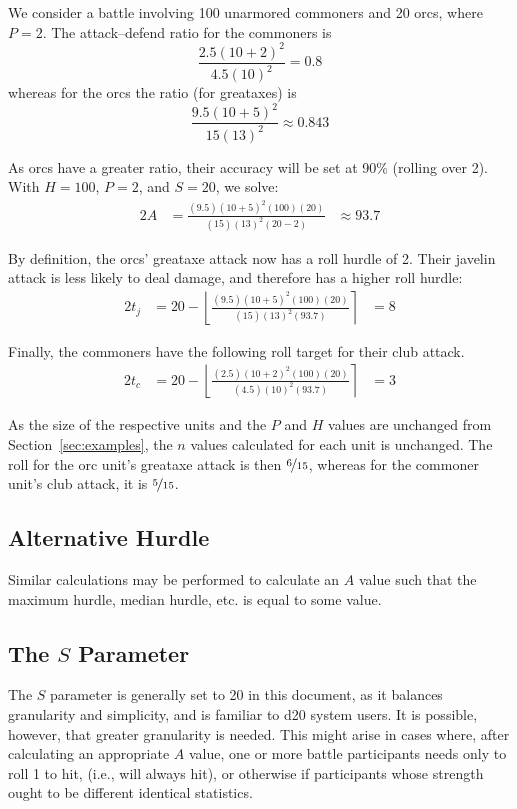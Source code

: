 \documentclass[twocolumn]{article}
\begin{document}
We consider a battle involving 100 unarmored commoners and 20 orcs,
where $P = 2$.
The attack--defend ratio for the commoners is
\[
    \frac
        {2.5 (10 + 2)^2}
        {4.5 (10)^2}
    =
    0.8
\]
whereas for the orcs the ratio (for greataxes) is
\[
    \frac
        {9.5 (10 + 5)^2}
        {15 (13)^2}
    \approx
    0.843
\]

As orcs have a greater ratio, their accuracy will be set at 90\% (rolling over 2).
With $H = 100$, $P = 2$, and $S = 20$,
we solve:
\begin{alignat*}{2}
    A &= 
        \frac
            {(9.5) (10 + 5)^2 (100) (20)}
            {(15) (13)^2 (20 - 2)}
        &{}\approx 93.7
\end{alignat*}

By definition, the orcs' greataxe attack now has a roll hurdle of 2.
Their javelin attack is less likely to deal damage,
and therefore has a higher roll hurdle:
\begin{alignat*}{2}
    t_j &=
        20 -
        \left\lfloor
            \frac
                {(9.5) (10 + 5)^2 (100) (20)}
                {(15) (13)^2 (93.7)}
        \right\rceil
            &= 8
\end{alignat*}

Finally, the commoners have the following roll target
for their club attack.
\begin{alignat*}{2}
    t_c &=
        20 -
        \left\lfloor
            \frac
                {(2.5) (10 + 2)^2 (100) (20)}
                {(4.5) (10)^2 (93.7)}
        \right\rceil
            &= 3
\end{alignat*}

As the size of the respective units and the $P$ and $H$ values
are unchanged from Section~\ref{sec:examples},
the $n$ values calculated for each unit is unchanged.
The roll for the orc unit's greataxe attack is then $\nicefrac{6}{15}$,
whereas for the commoner unit's club attack, it is $\nicefrac{5}{15}$.

\subsection{Alternative Hurdle}

Similar calculations may be performed to calculate an $A$ value
such that the maximum hurdle, median hurdle, etc.
is equal to some value.

\subsection{The $S$ Parameter}
The $S$ parameter is generally set to 20 in this document,
as it balances granularity and simplicity,
and is familiar to d20 system users.
It is possible, however, that greater granularity is needed.
This might arise in cases where,
after calculating an appropriate $A$ value,
one or more battle participants needs only to roll 1 to hit,
(i.e., will always hit),
or otherwise if participants whose strength ought to be different
identical statistics.
\end{document}
